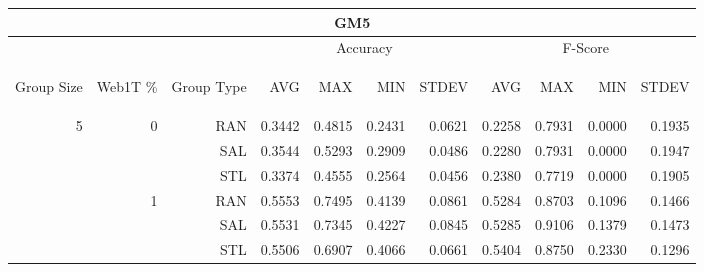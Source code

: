 \begin{center}
\begin{table}[htbp] 
 \begin{center}
\begin{tabular}{ | r | r | r | r | r | r | r | r | r | r | r |}
\hline
\multicolumn{11}{|c|}{GM5}\\
\hline
 & & & \multicolumn{4}{|c|}{Accuracy} & \multicolumn{4}{|c|}{F-Score}\\ \cline{4-11}
\begin{sideways}Group Size\end{sideways} & \begin{sideways}Web1T \%\end{sideways} & \begin{sideways}Group Type\end{sideways} & \begin{sideways}AVG\end{sideways} & \begin{sideways}MAX\end{sideways} & \begin{sideways}MIN\end{sideways} & \begin{sideways}STDEV\end{sideways} & \begin{sideways}AVG\end{sideways} & \begin{sideways}MAX\end{sideways} & \begin{sideways}MIN\end{sideways} & \begin{sideways}STDEV\end{sideways}\\
\hline
\multirow{18}{*}{5}
 & \multirow{3}{*}{0} & RAN & 0.3442 & 0.4815 & 0.2431 & 0.0621 & 0.2258 & 0.7931 & 0.0000 & 0.1935\\ \cline{3-11}
 &   & SAL & 0.3544 & 0.5293 & 0.2909 & 0.0486 & 0.2280 & 0.7931 & 0.0000 & 0.1947\\ \cline{3-11}
 &   & STL & 0.3374 & 0.4555 & 0.2564 & 0.0456 & 0.2380 & 0.7719 & 0.0000 & 0.1905\\ \cline{2-11}
 & \multirow{3}{*}{1} & RAN & 0.5553 & 0.7495 & 0.4139 & 0.0861 & 0.5284 & 0.8703 & 0.1096 & 0.1466\\ \cline{3-11}
 &   & SAL & 0.5531 & 0.7345 & 0.4227 & 0.0845 & 0.5285 & 0.9106 & 0.1379 & 0.1473\\ \cline{3-11}
 &   & STL & 0.5506 & 0.6907 & 0.4066 & 0.0661 & 0.5404 & 0.8750 & 0.2330 & 0.1296\\ \cline{2-11}

\end{tabular}
\end{center}
\end{table}
\end{center}
